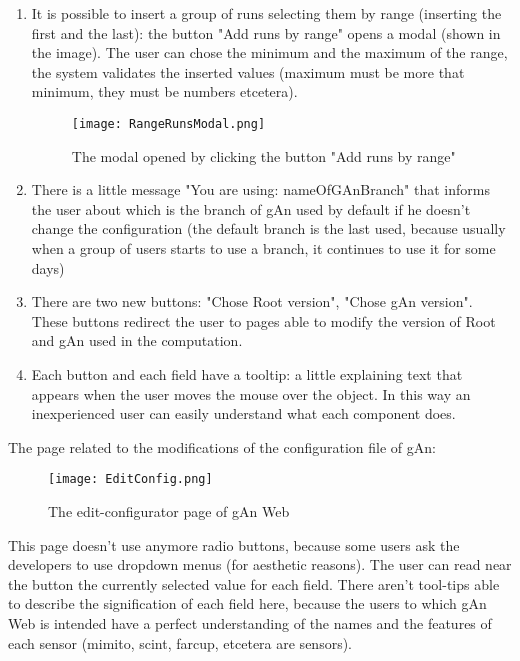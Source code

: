 \begin{enumerate}
\item It is possible to insert a group of runs selecting them by range (inserting the first and the last): the button "Add runs by range" opens a modal (shown in the image). The user can chose the minimum and the maximum of the range, the system validates the inserted values (maximum must be more that minimum, they must be numbers etcetera).

\begin{figure}[H]
\centering
\texttt{[image: RangeRunsModal.png]}  
\caption{The modal opened by clicking the button "Add runs by range"}
\end{figure}

\item There is a little message "You are using: nameOfGAnBranch" that informs the user about which is the branch of gAn used by default if he doesn't change the configuration (the default branch is the last used, because usually when a group of users starts to use a branch, it continues to use it for some days)

\item There are two new buttons: "Chose Root version", "Chose gAn version". These buttons redirect the user to pages able to modify the version of Root and gAn used in the computation.
 
\item Each button and each field have a tooltip: a little explaining text that appears when the user moves the mouse over the object. In this way an inexperienced user can easily understand what each component does.  

\end{enumerate}


The page related to the modifications of the configuration file of gAn:

\begin{figure}[H]
\centering
\texttt{[image: EditConfig.png]} 
\caption{The edit-configurator page of gAn Web}
\end{figure}

This page doesn't use anymore radio buttons, because some users ask the developers to use dropdown menus (for aesthetic reasons). The user can read near the button the currently selected value for each field. There aren't tool-tips able to describe the signification of each field here, because the users to which gAn Web is intended have a perfect understanding of the names and the features of each sensor (mimito, scint, farcup, etcetera are sensors).  




